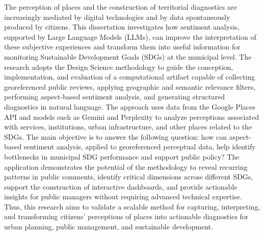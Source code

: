The perception of places and the construction of territorial diagnostics are increasingly mediated by digital technologies and by data spontaneously produced by citizens. This dissertation investigates how sentiment analysis, supported by Large Language Models (LLMs), can improve the interpretation of these subjective experiences and transform them into useful information for monitoring Sustainable Development Goals (SDGs) at the municipal level. The research adopts the Design Science methodology to guide the conception, implementation, and evaluation of a computational artifact capable of collecting georeferenced public reviews, applying geographic and semantic relevance filters, performing aspect-based sentiment analysis, and generating structured diagnostics in natural language. The approach uses data from the Google Places API and models such as Gemini and Perplexity to analyze perceptions associated with services, institutions, urban infrastructure, and other places related to the SDGs. The main objective is to answer the following question: how can aspect-based sentiment analysis, applied to georeferenced perceptual data, help identify bottlenecks in municipal SDG performance and support public policy? The application demonstrates the potential of the methodology to reveal recurring patterns in public comments, identify critical dimensions across different SDGs, support the construction of interactive dashboards, and provide actionable insights for public managers without requiring advanced technical expertise. Thus, this research aims to validate a scalable method for capturing, interpreting, and transforming citizens' perceptions of places into actionable diagnostics for urban planning, public management, and sustainable development.

